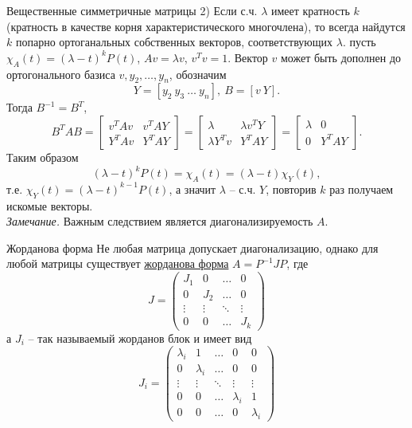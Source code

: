 \documentclass[10pt, handout]{beamer}
\begin{document}
\begin{frame}{Вещественные симметричные матрицы}
2) Если с.ч. $\lambda$ имеет кратность $k$ (кратность в качестве корня характеристического многочлена), то всегда найдутся $k$ попарно ортоганальных собственных векторов, соответствующих $\lambda$. пусть $\chi_A(t)=(\lambda-t)^kP(t)$, $Av=\lambda v$, $v^Tv=1$. Вектор $v$ может быть дополнен до ортогонального базиса $v, y_2, \ldots, y_n$, обозначим 
$$
Y=[y_2~y_3~\ldots~y_n],~B=[v~Y].
$$
\pause
Тогда $B^{-1}=B^T$,
$$
B^TAB=
\left[
\begin{array}{cc}
v^TAv & v^TAY\\
Y^TAv & Y^TAY
\end{array}
\right]
=
\left[
\begin{array}{cc}
\lambda & \lambda v^TY\\
\lambda Y^Tv & Y^TAY
\end{array}
\right]
=
\left[
\begin{array}{cc}
\lambda & 0\\
0 & Y^TAY
\end{array}
\right].
$$
Таким образом 
$$
(\lambda-t)^kP(t)=\chi_A(t)=(\lambda-t)\chi_Y(t),
$$
т.е. $\chi_Y(t)=(\lambda-t)^{k-1}P(t)$, а значит $\lambda$ -- с.ч. $Y$, повторив $k$ раз получаем искомые векторы.\\
\pause
\textit{Замечание.} Важным следствием является диагонализируемость $A$.


\end{frame}

\begin{frame}{Жорданова форма}
Не любая матрица допускает диагонализацию, однако для любой матрицы существует \underline{жорданова форма} $A=P^{-1}JP$, где
$$
J=\left(
\begin{array}{cccc}
J_1 & 0 & \ldots & 0\\
0 & J_2 & \ldots & 0\\
\vdots & \vdots & \ddots & \vdots \\
0 & 0 & \ldots & J_k
\end{array}
\right)
$$
а $J_i$ -- так называемый жорданов блок и имеет вид
$$
J_i=\left(
\begin{array}{ccccc}
\lambda_i & 1 & \ldots & 0 & 0\\
0 & \lambda_i & \ldots & 0 & 0\\
\vdots & \vdots & \ddots & \vdots & \vdots \\
0 & 0 & \ldots & \lambda_i & 1\\
0 & 0 & \ldots & 0 & \lambda_i
\end{array}
\right)
$$
\end{frame}
\end{document}
